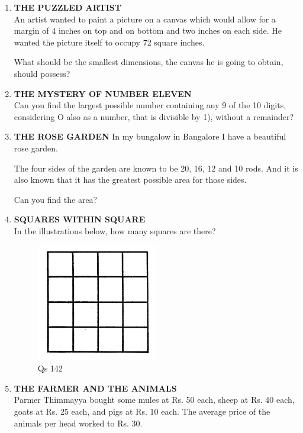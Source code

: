 \documentclass[12pt]{article}
\begin{document}
\begin{enumerate}
\item \textbf{THE  PUZZLED  ARTIST} \\
An artist  wanted  to paint  a picture  on a canvas  which would  allow  for a margin  of 4 inches  on top  and  on bottom  and  two  inches  on each  side.  He  wanted  the picture  itself  to occupy  72 square  inches. 

What  should  be the smallest  dimensions,  the canvas  he is going  to obtain,  should  possess? 


\item \textbf{THE  MYSTERY  OF NUMBER  ELEVEN} \\ 
Can you  find  the  largest  possible  number  containing any 9 of the 10 digits,  considering  O also  as a number, that is divisible  by 1), without  a remainder? 


\item \textbf{THE  ROSE  GARDEN}
In my bungalow  in Bangalore  I have  a beautiful  rose garden. 

The four  sides  of the garden  are known  to be 20,  16, 12 and 10 rods.  And  it is also  known  that  it has  the greatest  possible  area  for those  sides. 

Can you  find  the area? 

\item \textbf{SQUARES  WITHIN  SQUARE} \\ 
In tbe illustrations  below,  how  many  squares  are there? 
\begin{figure}[h]
\begin{center}
\includegraphics[width=0.5\textwidth]{images/sdevi_q142.png}
\caption{ Qs 142}
\end{center}
\end{figure}


\item \textbf{THE  FARMER  AND  THE  ANIMALS} \\
Parmer  Thimmayya  bought  some  mules  at Rs.  50 each,  sheep  at Rs.  40 each,  goats  at Rs.  25 each,  and pigs at Rs. 10 each.  The  average  price  of the  animals per head  worked  to Rs. 30. 


\end{enumerate}
\end{document}
